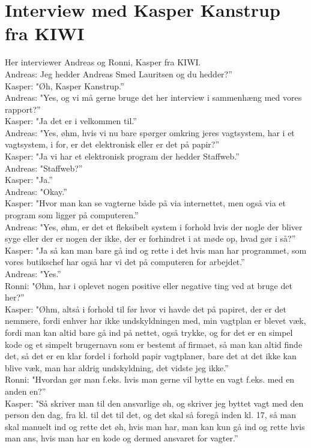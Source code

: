 \section{Interview med Kasper Kanstrup fra KIWI}\label{app:kiwi}
Her interviewer Andreas og Ronni, Kasper fra KIWI.\\
Andreas: Jeg hedder Andreas Smed Lauritsen og du hedder?”\\
Kasper: "Øh, Kasper Kanstrup.”\\
Andreas: "Yes, og vi må gerne bruge det her interview i sammenhæng med vores rapport?”\\
Kasper: "Ja det er i velkommen til.”\\
Andreas: "Yes, øhm, hvis vi nu bare spørger omkring jeres vagtsystem, har i et vagtsystem, i for, er det elektronisk eller er det på papir?”\\
Kasper: "Ja vi har et elektronisk program der hedder Staffweb.”\\
Andreas: "Staffweb?”\\
Kasper: "Ja.”\\
Andreas: "Okay.”\\
Kasper: "Hvor man kan se vagterne både på via internettet, men også via et program som ligger på computeren.”\\
Andreas: "Yes, øhm, er det et fleksibelt system i forhold hvis der nogle der bliver syge eller der er nogen der ikke, der er forhindret i at møde op, hvad gør i så?”\\
Kasper: "Ja så kan man bare gå ind og rette i det hvis man har programmet, som vores butikschef har også har vi det på computeren for arbejdet.”\\
Andreas: "Yes.”\\
Ronni: "Øhm, har i oplevet nogen positive eller negative ting ved at bruge det her?”\\
Kasper: "Øhm, altså i forhold til før hvor vi havde det på papiret, der er det nemmere, fordi enhver har ikke undskyldningen med, min vagtplan er blevet væk, fordi man kan altid bare gå ind på nettet, også trykke, og for det er en simpel kode og et simpelt brugernavn som er bestemt af firmaet, så man kan altid finde det, så det er en klar fordel i forhold papir vagtplaner, bare det at det ikke kan blive væk, man har aldrig undskyldning, det vidste jeg ikke.”\\
Ronni: "Hvordan gør man f.eks. hvis man gerne vil bytte en vagt f.eks. med en anden en?”\\
Kasper: "Så skriver man til den ansvarlige øh, og skriver jeg byttet vagt med den person den dag, fra kl. til det til det, og det skal så foregå inden kl. 17, så man skal manuelt ind og rette det øh, hvis man har, man kan kun gå ind og rette hvis man ans, hvis man har en kode og dermed ansvaret for vagter.”\\
